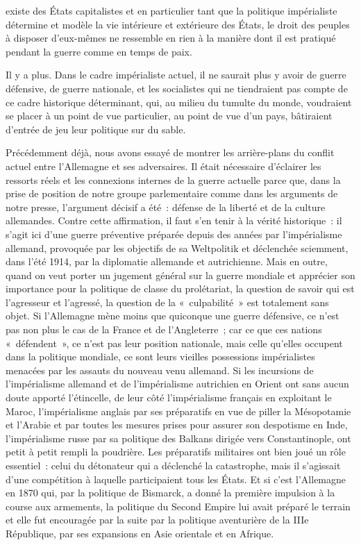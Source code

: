 \documentclass[french,twoside]{book} %
\begin{document}
existe des États capitalistes et en particulier tant que la politique impérialiste détermine et modèle la vie intérieure et extérieure des États, le droit des peuples à disposer d’eux-mêmes ne ressemble en rien à la manière dont il est pratiqué pendant la guerre comme en temps de paix.\par
Il y a plus. Dans le cadre impérialiste actuel, il ne saurait plus y avoir de guerre défensive, de guerre nationale, et les socialistes qui ne tiendraient pas compte de ce cadre historique déterminant, qui, au milieu du tumulte du monde, voudraient se placer à un point de vue particulier, au point de vue d’un pays, bâtiraient d’entrée de jeu leur politique sur du sable.\par
Précédemment déjà, nous avons essayé de montrer les arrière-plans du conflit actuel entre l’Allemagne et ses adversaires. Il était nécessaire d’éclairer les ressorts réels et les connexions internes de la guerre actuelle parce que, dans la prise de position de notre groupe parlementaire comme dans les arguments de notre presse, l’argument décisif a été : défense de la liberté et de la culture allemandes. Contre cette affirmation, il faut s’en tenir à la vérité historique : il s’agit ici d’une guerre préventive préparée depuis des années par l’impérialisme allemand, provoquée par les objectifs de sa Weltpolitik et déclenchée sciemment, dans l’été 1914, par la diplomatie allemande et autrichienne. Mais en outre, quand on veut porter un jugement général sur la guerre mondiale et apprécier son importance pour la politique de classe du prolétariat, la question de savoir qui est l’agresseur et l’agressé, la question de la « culpabilité » est totalement sans objet. Si l’Allemagne mène moins que quiconque une guerre défensive, ce n’est pas non plus le cas de la France et de l’Angleterre ; car ce que ces nations « défendent », ce n’est pas leur position nationale, mais celle qu’elles occupent dans la politique mondiale, ce sont leurs vieilles possessions impérialistes menacées par les assauts du nouveau venu allemand. Si les incursions de l’impérialisme allemand et de l’impérialisme autrichien en Orient ont sans aucun doute apporté l’étincelle, de leur côté l’impérialisme français en exploitant le Maroc, l’impérialisme anglais par ses préparatifs en vue de piller la Mésopotamie et l’Arabie et par toutes les mesures prises pour assurer son despotisme en Inde, l’impérialisme russe par sa politique des Balkans dirigée vers Constantinople, ont petit à petit rempli la poudrière. Les préparatifs militaires ont bien joué un rôle essentiel : celui du détonateur qui a déclenché la catastrophe, mais il s’agissait d’une compétition à laquelle participaient tous les États. Et si c’est l’Allemagne en 1870 qui, par la politique de Bismarck, a donné la première impulsion à la course aux  armements, la politique du Second Empire lui avait préparé le terrain et elle fut encouragée par la suite par la politique aventurière de la IIIe République, par ses expansions en Asie orientale et en Afrique.\par
\end{document}
